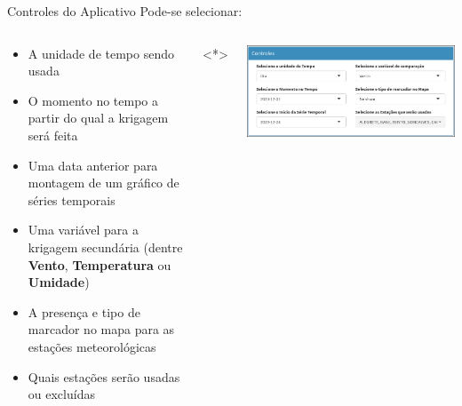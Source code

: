 \documentclass[aspectratio=1610]{beamer}
\begin{document}
\begin{frame}{Controles do Aplicativo}
    Pode-se selecionar:
    \begin{columns}
        \begin{column}{0.5\textwidth}
            \begin{itemize}
                \item A unidade de tempo sendo usada \pause
                \item O momento no tempo a partir do qual a krigagem será feita \pause
                \item Uma data anterior para montagem de um gráfico de séries temporais \pause
                \item Uma variável para a krigagem secundária (dentre \textbf{Vento}, \textbf{Temperatura} ou \textbf{Umidade}) \pause
                \item A presença e tipo de marcador no mapa para as estações meteorológicas \pause
                \item Quais estações serão usadas ou excluídas
            \end{itemize}
        \end{column}
        \onslide<*>
        \begin{column}{0.5\textwidth}
            \includegraphics[width=\textwidth]{Controles.png}
            \begin{tcolorbox}[title=Código,colback=wcprimary10,colbacktitle=wcprimary,colframe=white,fontlower=\small]
            \end{tcolorbox}
        \end{column}
    \end{columns}
\end{frame}
\end{document}

